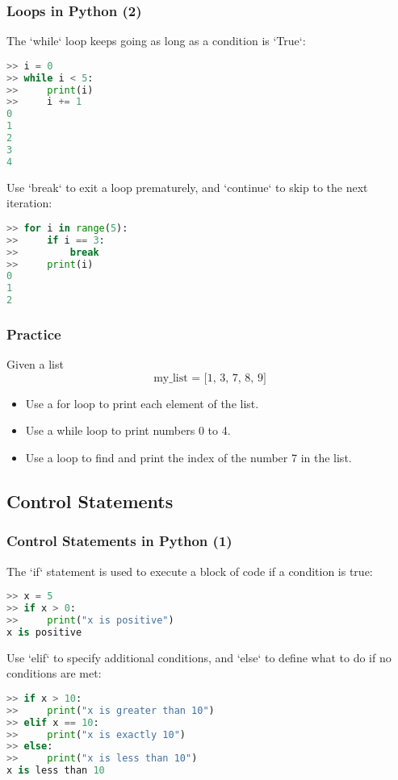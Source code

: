 \begin{frame}[fragile]
  \frametitle{Loops in Python (2)}
  The `while` loop keeps going as long as a condition is `True`:
  \begin{lstlisting}[language=Python]
>> i = 0
>> while i < 5:
>>     print(i)
>>     i += 1
0
1
2
3
4
  \end{lstlisting}\pause
  Use `break` to exit a loop prematurely, and `continue` to skip to the next iteration:
  \begin{lstlisting}[language=Python]
>> for i in range(5):
>>     if i == 3:
>>         break
>>     print(i)
0
1
2
  \end{lstlisting}
\end{frame}

\begin{frame}[fragile]
 \frametitle{Practice}
 Given a list
 \[
    \text{my\_list = [1, 3, 7, 8, 9]}
 \]
 \begin{itemize}
  \item Use a for loop to print each element of the list.\pause
  \item Use a while loop to print numbers 0 to 4.\pause
  \item Use a loop to find and print the index of the number 7 in the list.
 \end{itemize}
\end{frame}

\subsection*{Control Statements}
\begin{frame}[fragile]
  \frametitle{Control Statements in Python (1)}
  The `if` statement is used to execute a block of code if a condition is true:
  \begin{lstlisting}[language=Python]
>> x = 5
>> if x > 0:
>>     print("x is positive")
x is positive
  \end{lstlisting}\pause
  Use `elif` to specify additional conditions, and `else` to define what to do if no conditions are met:
  \begin{lstlisting}[language=Python]
>> if x > 10:
>>     print("x is greater than 10")
>> elif x == 10:
>>     print("x is exactly 10")
>> else:
>>     print("x is less than 10")
x is less than 10
  \end{lstlisting}
\end{frame}


